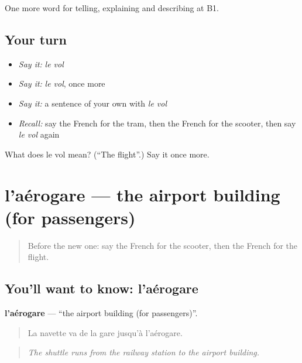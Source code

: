 \begin{grammarlens}[title={What you've built}]
One more word for telling, explaining and describing at B1.
\end{grammarlens}

\subsection*{Your turn}
\begin{itemize}
\raggedright
  \item \emph{Say it:} \emph{le vol}
  \item \emph{Say it:} \emph{le vol}, once more
  \item \emph{Say it:} a sentence of your own with \emph{le vol}
  \item \emph{Recall:} say the French for the tram, then the French for the scooter, then say \emph{le vol} again
\end{itemize}

\begin{tcolorbox}[breakable,colback=teal!4,colframe=teal!35!black,title={Before you move on}]
What does le vol mean? (\textquotedblleft{}The flight\textquotedblright{}.) Say it once more.
\end{tcolorbox}
\section[l'aérogare]{l'aérogare — the airport building (for passengers)}

\label{lesson:FR-C416-aerogare}



\begin{quote}
Before the new one: say the French for the scooter, then the French for the flight.
\end{quote}

\subsection*{You'll want to know: l'aérogare}
\textbf{l'aérogare} — \textquotedblleft{}the airport building (for passengers)\textquotedblright{}.

\begin{quote}
La navette va de la gare jusqu'à l'aérogare.
\end{quote}

\begin{quote}
\emph{The shuttle runs from the railway station to the airport building.}
\end{quote}

